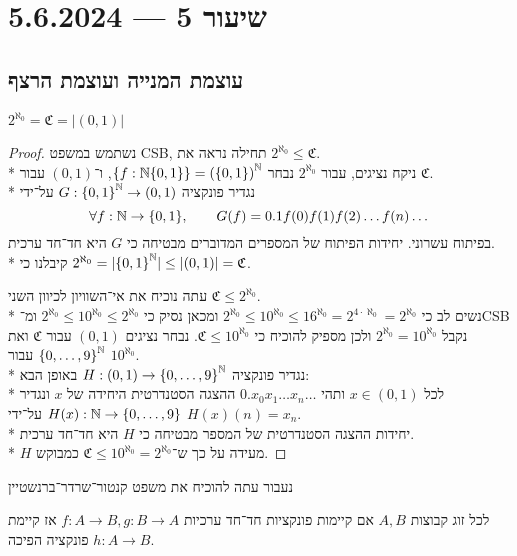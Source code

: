 \section{שיעור 5 --- 5.6.2024}
\subsection{עוצמת המנייה ועוצמת הרצף}
\begin{theorem}
	$2^{\aleph_0} = \mathfrak{C} = |(0, 1)|$
\end{theorem}
\begin{proof}
	נשתמש במשפט CSB, תחילה נראה את $2^{\aleph_0} \le \mathfrak{C}$. \\*
	ניקח נציגים, עבור $2^{\aleph_0}$ נבחר $\{ f : \mathbb{N} \{0, 1\} \} = {(\{0, 1\})}^{\mathbb{N}}$, ו־$(0, 1)$ עבור $\mathfrak{C}$. \\*
		נגדיר פונקציה $G : {\{0, 1\}}^{\mathbb{N}} \to (0, 1)$ על־ידי
		\[
			\forall f : \mathbb{N} \to \{0, 1\},
			\qquad
			G(f) = 0.1f(0) f(1) f(2) \dots f(n)\dots
		\]
		בפיתוח עשרוני. יחידות הפיתוח של המספרים המדוברים מבטיחה כי $G$ היא חד־חד ערכית. \\*
		קיבלנו כי $2^{\aleph_0} = |{\{0, 1\}}^{\mathbb{N}}| \le |(0, 1)| = \mathfrak{C}$.

		עתה נוכיח את אי־השוויון לכיוון השני $\mathfrak{C} \le 2^{\aleph_0}$. \\*
		נשים לב כי $2^{\aleph_0} \le 10^{\aleph_0} \le 16^{\aleph_0} = 2^{4 \cdot \aleph_0} = 2^{\aleph_0}$
		ומכאן נסיק כי $2^{\aleph_0} \le 10^{\aleph_0} \le 2^{\aleph_0}$ ומ־CSB נקבל $2^{\aleph_0} = 10^{\aleph_0}$
		ולכן מספיק להוכיח כי $\mathfrak{C} \le 10^{\aleph_0}$.
		נבחר נציגים $(0, 1)$ עבור $\mathfrak{C}$ ואת ${\{0, \dots, 9\}}^{\mathbb{N}}$ עבור $10^{\aleph_0}$. \\*
		נגדיר פונקציה $H : (0, 1) \to {\{0, \dots, 9\}}^{\mathbb{N}}$ באופן הבא: \\*
		לכל $x \in (0, 1)$ ותהי $0.x_0 x_1 \dots x_n\dots$ ההצגה הסטנדרטית היחידה של $x$ ונגדיר $H(x) : \mathbb{N} \to \{0, \dots, 9\}$ על־ידי $H(x)(n) = x_n$. \\*
		יחידות ההצגה הסטנדרטית של המספר מבטיחה כי $H$ היא חד־חד ערכית. \\*
		$H$ מעידה על כך ש־$\mathfrak{C} \le 10^{\aleph_0} = 2^{\aleph_0}$ כמבוקש.
\end{proof}
נעבור עתה להוכיח את משפט קנטור־שרדר־ברנשטיין
\begin{theorem}
	לכל זוג קבוצות $A, B$ אם קיימות פונקציות חד־חד ערכיות $f : A \to B, g : B \to A$ אז קיימת פונקציה הפיכה $h : A \to B$.
\end{theorem}
